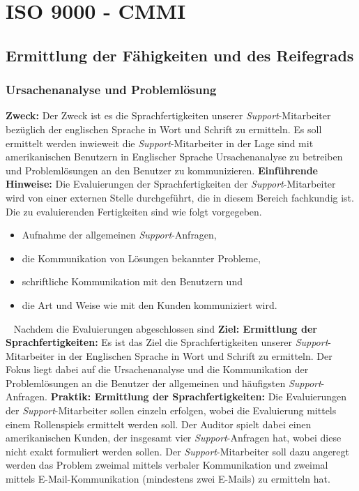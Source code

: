 \section{ISO 9000 - CMMI}
\label{sec:cmmi}
\subsection{Ermittlung der Fähigkeiten und des Reifegrads}
\label{sec:cmmi-capability-analysis}
\subsubsection{Ursachenanalyse und Problemlösung}
\label{sec:cmmi-1}
\textbf{Zweck:}
\newline
Der Zweck ist es die Sprachfertigkeiten unserer \emph{Support}-Mitarbeiter bezüglich der englischen Sprache in Wort und Schrift zu ermitteln. Es soll ermittelt werden inwieweit die \emph{Support}-Mitarbeiter in der Lage sind mit amerikanischen Benutzern in Englischer Sprache Ursachenanalyse zu betreiben und Problemlösungen an den Benutzer zu kommunizieren.
\newline
\newline
\textbf{Einführende Hinweise:}
\newline
Die Evaluierungen der Sprachfertigkeiten der \emph{Support}-Mitarbeiter wird von einer externen Stelle durchgeführt, die in diesem Bereich fachkundig ist. Die zu evaluierenden Fertigkeiten sind wie folgt vorgegeben.
\begin{itemize}
	\item Aufnahme der allgemeinen \emph{Support}-Anfragen,
	\item die Kommunikation von Lösungen bekannter Probleme,
	\item schriftliche Kommunikation mit den Benutzern und
	\item die Art und Weise wie mit den Kunden kommuniziert wird.  
\end{itemize} 
\ \newline
Nachdem die Evaluierungen abgeschlossen sind
\newline
\newline
\textbf{Ziel: Ermittlung der Sprachfertigkeiten:}
\newline
Es ist das Ziel die Sprachfertigkeiten unserer \emph{Support}-Mitarbeiter in der Englischen Sprache in Wort und Schrift zu ermitteln. Der Fokus liegt dabei auf die Ursachenanalyse und die Kommunikation der Problemlösungen an die Benutzer der allgemeinen und häufigsten \emph{Support}-Anfragen.
\newline
\newline
\textbf{Praktik: Ermittlung der Sprachfertigkeiten:}
\newline
Die Evaluierungen der \emph{Support}-Mitarbeiter sollen einzeln erfolgen,  wobei die Evaluierung mittels einem Rollenspiels ermittelt werden soll. Der Auditor spielt dabei einen amerikanischen Kunden, der insgesamt vier \emph{Support}-Anfragen hat, wobei diese nicht exakt formuliert werden sollen. Der \emph{Support}-Mitarbeiter soll dazu angeregt werden das Problem zweimal mittels verbaler Kommunikation und zweimal mittels E-Mail-Kommunikation (mindestens zwei E-Mails) zu ermitteln hat.  

